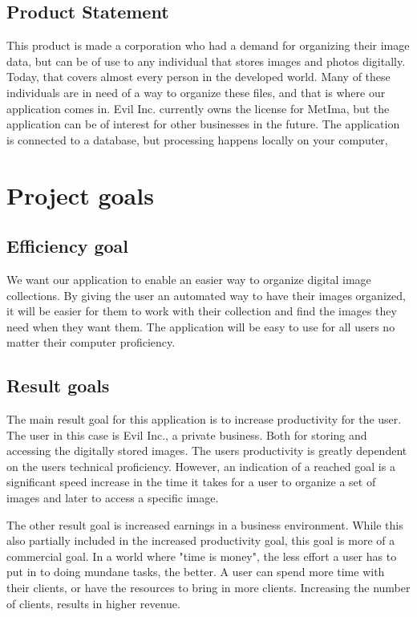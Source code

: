 \documentclass{article}
\begin{document}
\subsection{Product Statement}
This product is made a corporation who had a demand for organizing their image data, but can be of use to any individual that stores images and photos digitally. Today, that covers almost every person in the developed world. Many of these individuals are in need of a way to organize these files, and that is where our application comes in. Evil Inc. currently owns the license for MetIma, but the application can be of interest for other businesses in the future. The application is connected to a database, but processing happens locally on your computer,

\section{Project goals}

\subsection{Efficiency goal}
We want our application to enable an easier way to organize digital image collections. By giving the user an automated way to have their images organized, it will be easier for them to work with their collection and find the images they need when they want them. The application will be easy to use for all users no matter their computer proficiency.

\subsection{Result goals}
The main result goal for this application is to increase productivity for the user. The user in this case is Evil Inc., a private business. Both for storing and accessing the digitally stored images. The users productivity is greatly dependent on the users technical proficiency. However, an indication of a reached goal is a significant speed increase in the time it takes for a user to organize a set of images and later to access a specific image.

The other result goal is increased earnings in a business environment. While this also partially included in the increased productivity goal, this goal is more of a commercial goal. In a world where "time is money", the less effort a user has to put in to doing mundane tasks, the better. A user can spend more time with their clients, or have the resources to bring in more clients. Increasing the number of clients, results in higher revenue.
\end{document}
